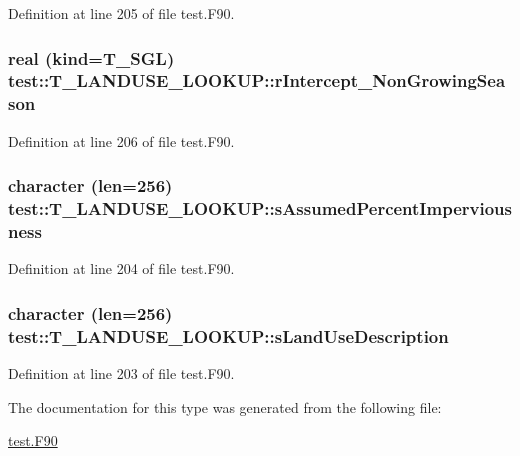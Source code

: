 Definition at line 205 of file test.F90.

\hypertarget{typetest_1_1_t___l_a_n_d_u_s_e___l_o_o_k_u_p_a5a0a4a4068f5162d44b526fcb89f9724}{
\subsubsection[{rIntercept\_\-NonGrowingSeason}]{\setlength{\rightskip}{0pt plus 5cm}real (kind={\bf T\_\-SGL}) {\bf test::T\_\-LANDUSE\_\-LOOKUP::rIntercept\_\-NonGrowingSeason}}}
\label{typetest_1_1_t___l_a_n_d_u_s_e___l_o_o_k_u_p_a5a0a4a4068f5162d44b526fcb89f9724}


Definition at line 206 of file test.F90.

\hypertarget{typetest_1_1_t___l_a_n_d_u_s_e___l_o_o_k_u_p_a6c2aa3ab3e9f5f53471866888164bc76}{
\subsubsection[{sAssumedPercentImperviousness}]{\setlength{\rightskip}{0pt plus 5cm}character (len=256) {\bf test::T\_\-LANDUSE\_\-LOOKUP::sAssumedPercentImperviousness}}}
\label{typetest_1_1_t___l_a_n_d_u_s_e___l_o_o_k_u_p_a6c2aa3ab3e9f5f53471866888164bc76}


Definition at line 204 of file test.F90.

\hypertarget{typetest_1_1_t___l_a_n_d_u_s_e___l_o_o_k_u_p_a1894ba6b22e884df7ca4023902e5bad5}{
\subsubsection[{sLandUseDescription}]{\setlength{\rightskip}{0pt plus 5cm}character (len=256) {\bf test::T\_\-LANDUSE\_\-LOOKUP::sLandUseDescription}}}
\label{typetest_1_1_t___l_a_n_d_u_s_e___l_o_o_k_u_p_a1894ba6b22e884df7ca4023902e5bad5}


Definition at line 203 of file test.F90.



The documentation for this type was generated from the following file:\begin{DoxyCompactItemize}
\item 
\hyperlink{test_8_f90}{test.F90}\end{DoxyCompactItemize}
